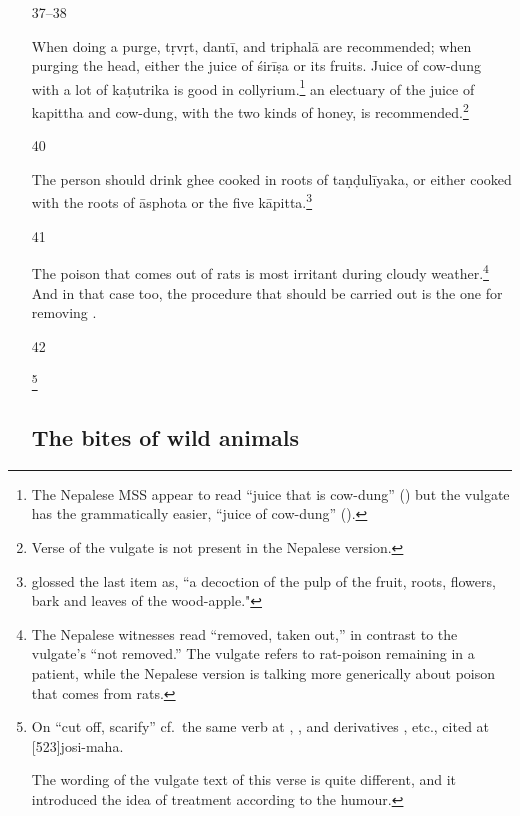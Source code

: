 \begin{translation}
\begin{itemize}
\item[37--38]

When doing a purge, \gls{tṛvṛt}, \gls{dantī}, and \gls{triphalā} are
recommended;  when purging the head, either the juice of \gls{śirīṣa}
or its fruits. Juice of cow-dung with a lot of \gls{kaṭutrika} is
good in collyrium.\footnote{The Nepalese MSS appear to read “juice
    that is cow-dung” () but the vulgate has the
    grammatically easier, “juice of cow-dung” ().} an
    electuary of the juice of \gls{kapittha} and cow-dung, with the two
    kinds of honey, is recommended.\footnote{Verse  of
        the vulgate is not present in the Nepalese version.}

\item[40]

The person should drink ghee cooked in roots of \gls{taṇḍulīyaka}, or
either cooked with the roots of \gls{āsphota} or the five
\gls{kāpitta}.\footnote{ glossed the last item
    as, “a decoction of the pulp of the fruit, roots, flowers, bark and leaves
    of the wood-apple."}

\item[41]

The poison that comes out of rats is most irritant during cloudy
weather.\footnote{The Nepalese witnesses read 
    “removed, taken out,” in contrast to the vulgate's 
    “not removed.”  The vulgate refers to rat-poison remaining in a
    patient, while the Nepalese version is talking more generically about
    poison that comes from rats.} And in that case too, the procedure
    that should be carried out is the one for removing
    .
    
\item[42]

\footnote{On  “cut off, scarify” cf.\ the same
    verb at , , and derivatives
    , etc., cited at
    [523]{josi-maha}.

The wording of the vulgate text of this verse is quite different, and it
introduced the idea of treatment according to the humour.}

\subsection{The bites of wild animals}
\label{rabies}


\end{itemize}
\end{translation}
